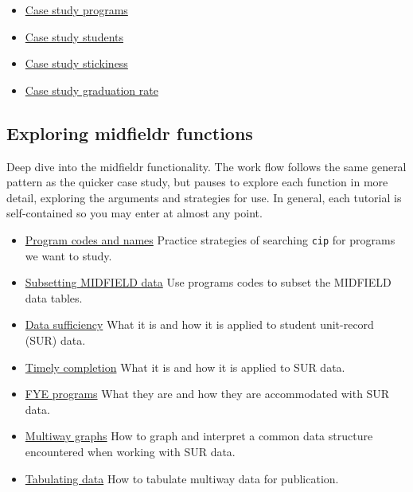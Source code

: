 \documentclass[
]{book}
\providecommand{\tightlist}{%
  \setlength{\itemsep}{0pt}\setlength{\parskip}{0pt}}
\begin{document}
\begin{itemize}
\tightlist
\item
  \href{https://midfieldr.github.io/midfieldr/articles/art-110-case-study-programs.html}{Case study programs}
\item
  \href{https://midfieldr.github.io/midfieldr/articles/art-120-case-study-students.html}{Case study students}
\item
  \href{https://midfieldr.github.io/midfieldr/articles/art-130-case-study-stickiness.html}{Case study stickiness}
\item
  \href{https://midfieldr.github.io/midfieldr/articles/art-140-case-study-grad-rate.html}{Case study graduation rate}
\end{itemize}

\hypertarget{exploring-midfieldr-functions}{%
\subsection{Exploring midfieldr functions}\label{exploring-midfieldr-functions}}

Deep dive into the midfieldr functionality. The work flow follows the same general pattern as the quicker case study, but pauses to explore each function in more detail, exploring the arguments and strategies for use. In general, each tutorial is self-contained so you may enter at almost any point.

\begin{itemize}
\tightlist
\item
  \href{https://midfieldr.github.io/midfieldr/articles/art-010-program-codes.html}{Program codes and names} Practice strategies of searching \texttt{cip} for programs we want to study.
\item
  \href{https://midfieldr.github.io/midfieldr/articles/art-015-subsetting-midfield-data.html}{Subsetting MIDFIELD data} Use programs codes to subset the MIDFIELD data tables.
\item
  \href{https://midfieldr.github.io/midfieldr/articles/art-020-data-sufficiency.html}{Data sufficiency} What it is and how it is applied to student unit-record (SUR) data.
\item
  \href{https://midfieldr.github.io/midfieldr/articles/art-030-timely-completion.html}{Timely completion} What it is and how it is applied to SUR data.
\item
  \href{https://midfieldr.github.io/midfieldr/articles/art-040-fye-programs.html}{FYE programs} What they are and how they are accommodated with SUR data.
\item
  \href{https://midfieldr.github.io/midfieldr/articles/art-050-multiway-graphs.html}{Multiway graphs} How to graph and interpret a common data structure encountered when working with SUR data.
\item
  \href{https://midfieldr.github.io/midfieldr/articles/art-060-tabulating-data.html}{Tabulating data} How to tabulate multiway data for publication.
\end{itemize}
\end{document}
